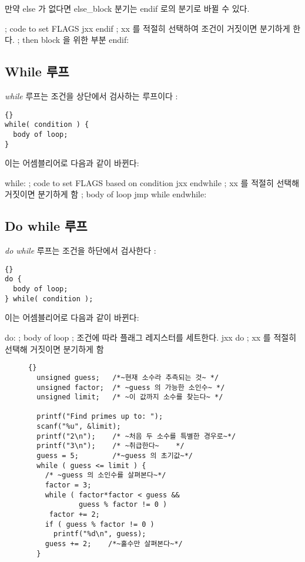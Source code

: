 만약 else 가 없다면 {\code else\_block} 분기는 {\code endif} 로의 분기로 바뀔 수 있다. 
\begin{AsmCodeListing}[frame=none]
      ; code to set FLAGS
      jxx    endif          ; xx 를 적절히 선택하여 조건이 거짓이면 분기하게 한다. 
      ; then block 을 위한 부분
endif:
\end{AsmCodeListing}

\subsection{While 루프 }
\emph{while} 루프는 조건을 상단에서 검사하는 루프이다 : 
\begin{lstlisting}[stepnumber=0]{}
while( condition ) {
  body of loop;
}
\end{lstlisting}
\noindent 이는 어셈블리어로 다음과 같이 바뀐다:
\begin{AsmCodeListing}[frame=none]
while:
      ; code to set FLAGS based on condition
      jxx    endwhile       ; xx 를 적절히 선택해 거짓이면 분기하게 함
      ; body of loop
      jmp    while
endwhile:
\end{AsmCodeListing}

\subsection{Do while 루프 }
\emph{do while} 루프는 조건을 하단에서 검사한다 :

\begin{lstlisting}[stepnumber=0]{}
do {
  body of loop;
} while( condition );
\end{lstlisting}
\noindent 이는 어셈블리어로 다음과 같이 바뀐다:
\begin{AsmCodeListing}[frame=none]
do:
      ; body of loop
      ; 조건에 따라 플래그 레지스터를 세트한다. 
      jxx    do          ; xx 를 적절히 선택해 거짓이면 분기하게 함
\end{AsmCodeListing}

\begin{figure}[t]
\begin{lstlisting}[frame=tlrb,escapeinside=~~]{}
  unsigned guess;   /*~현재 소수라 추측되는 것~ */
  unsigned factor;  /* ~guess 의 가능한 소인수~ */
  unsigned limit;   /* ~이 값까지 소수를 찾는다~ */

  printf("Find primes up to: ");
  scanf("%u", &limit);
  printf("2\n");    /* ~처음 두 소수를 특별한 경우로~*/
  printf("3\n");    /* ~취급한다~    */
  guess = 5;        /*~guess 의 초기값~*/
  while ( guess <= limit ) {
    /* ~guess 의 소인수를 살펴본다~*/
    factor = 3;
    while ( factor*factor < guess &&
            guess % factor != 0 )
     factor += 2;
    if ( guess % factor != 0 )
      printf("%d\n", guess);
    guess += 2;    /*~홀수만 살펴본다~*/
  }
\end{lstlisting}
\caption{}\label{fig:primec}
\end{figure}

